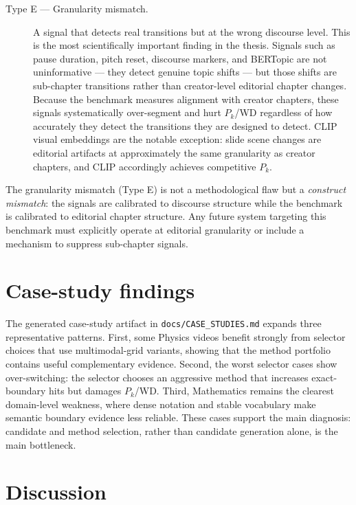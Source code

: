 \begin{description}
  \item[Type E --- Granularity mismatch.] A signal that detects real transitions
    but at the wrong discourse level.
    This is the most scientifically important finding in the thesis.
    Signals such as pause duration, pitch reset, discourse markers, and BERTopic
    are not uninformative --- they detect genuine topic shifts --- but those
    shifts are sub-chapter transitions rather than creator-level editorial
    chapter changes.
    Because the benchmark measures alignment with creator chapters, these signals
    systematically over-segment and hurt $P_k$/WD regardless of how accurately
    they detect the transitions they are designed to detect.
    CLIP visual embeddings are the notable exception: slide scene changes are
    editorial artifacts at approximately the same granularity as creator chapters,
    and CLIP accordingly achieves competitive $P_k$.
\end{description}

The granularity mismatch (Type E) is not a methodological flaw but a
\emph{construct mismatch}: the signals are calibrated to discourse structure
while the benchmark is calibrated to editorial chapter structure.
Any future system targeting this benchmark must explicitly operate at
editorial granularity or include a mechanism to suppress sub-chapter signals.

\section{Case-study findings}
\label{sec:case_studies}

The generated case-study artifact in \texttt{docs/CASE\_STUDIES.md} expands
three representative patterns. First, some Physics videos benefit strongly from
selector choices that use multimodal-grid variants, showing that the method
portfolio contains useful complementary evidence. Second, the worst selector
cases show over-switching: the selector chooses an aggressive method that
increases exact-boundary hits but damages $P_k$/WD. Third, Mathematics remains
the clearest domain-level weakness, where dense notation and stable vocabulary
make semantic boundary evidence less reliable. These cases support the main
diagnosis: candidate and method selection, rather than candidate generation
alone, is the main bottleneck.



\section{Discussion}
\label{sec:discussion}

